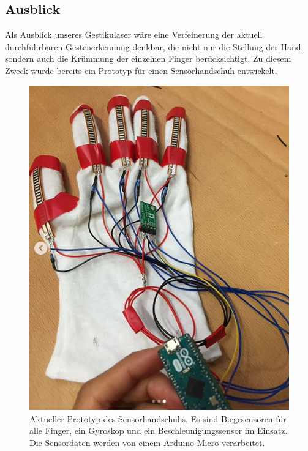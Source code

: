 \documentclass{sciposter}
\begin{document}
\begin{multicols}{3}
\section{Ausblick}
Als Ausblick unseres Gestikulaser wäre eine Verfeinerung der aktuell durchführbaren Gestenerkennung denkbar, die nicht nur die Stellung der Hand, sondern auch die Krümmung der einzelnen Finger berücksichtigt. Zu diesem Zweck wurde bereits ein Prototyp für einen Sensorhandschuh entwickelt.

\begin{figure}[h]
	\centering
	\includegraphics[scale=1.4]{../figures/Sensorhandschuh}
	\caption{Aktueller Prototyp des Sensorhandschuhs. Es sind Biegesensoren für alle Finger, ein Gyroskop und ein Beschleunigungssensor im Einsatz. Die Sensordaten 
	werden von einem Arduino Micro verarbeitet.}
	\label{fig:Sensorhandschuh}
\end{figure}


\end{multicols}
\end{document}
